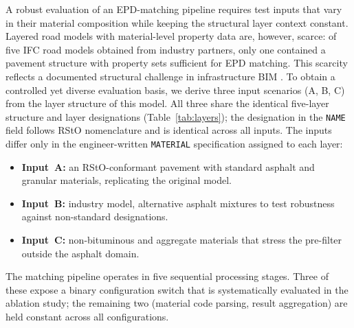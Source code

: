 \documentclass[10pt, a4paper, twocolumn]{article}
\begin{document}
A robust evaluation of an EPD-matching pipeline requires test inputs that vary in
their material composition while keeping the structural layer context constant.
Layered road models with material-level property data are, however, scarce: of
five IFC road models obtained from industry partners, only one contained a
pavement structure with property sets sufficient for EPD matching. This scarcity
reflects a documented structural challenge in infrastructure BIM \cite{Kaus.2025}. 
To obtain a controlled yet diverse evaluation basis, we
derive three input scenarios (A, B, C) from the layer structure of this model.
All three share the identical five-layer structure and layer designations
(Table~\ref{tab:layers}); the designation in the \texttt{NAME} field follows RStO
nomenclature and is identical across all inputs. The inputs differ only in the
engineer-written \texttt{MATERIAL} specification assigned to each layer:

\begin{itemize}[leftmargin=*, itemsep=2pt, topsep=2pt]
  \item \textbf{Input~A:} an RStO-conformant pavement with standard
        asphalt and granular materials, replicating the original model.
  \item \textbf{Input~B:} industry model, alternative asphalt mixtures to test robustness against non-standard designations.
  \item \textbf{Input~C:} non-bituminous and aggregate materials that stress the
        pre-filter outside the asphalt domain.
\end{itemize}


The matching pipeline operates in five sequential processing stages. Three of
these expose a binary configuration switch that is systematically evaluated in
the ablation study; the remaining two (material code parsing, result aggregation)
are held constant across all configurations.
\end{document}
